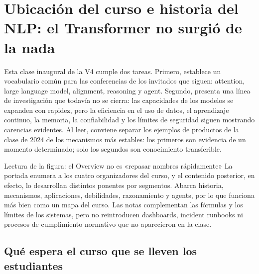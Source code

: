 \section{Ubicación del curso e historia del NLP: el Transformer no surgió de la nada}

Esta clase inaugural de la V4 cumple dos tareas. Primero, establece un vocabulario común para las conferencias de los invitados que siguen: attention, large language model, alignment, reasoning y agent. Segundo, presenta una línea de investigación que todavía no se cierra: las capacidades de los modelos se expanden con rapidez, pero la eficiencia en el uso de datos, el aprendizaje continuo, la memoria, la confiabilidad y los límites de seguridad siguen mostrando carencias evidentes. Al leer, conviene separar los ejemplos de productos de la clase de 2024 de los mecanismos más estables: los primeros son evidencia de un momento determinado; solo los segundos son conocimiento transferible.


\begin{knowledgebox}{Lectura de la figura: el Overview no es «repasar nombres rápidamente»}
La portada enumera a los cuatro organizadores del curso, y el contenido posterior, en efecto, lo desarrollan distintos ponentes por segmentos. Abarca historia, mecanismos, aplicaciones, debilidades, razonamiento y agents, por lo que funciona más bien como un mapa del curso. Las notas complementan las fórmulas y los límites de los sistemas, pero no reintroducen dashboards, incident runbooks ni procesos de cumplimiento normativo que no aparecieron en la clase.
\end{knowledgebox}


\subsection{Qué espera el curso que se lleven los estudiantes}

